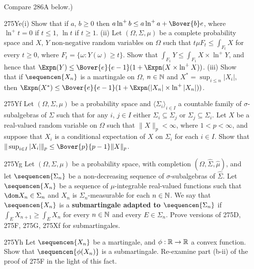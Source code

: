 {



\noindent Compare 286A below.)

\spheader 275Ye(i)
Show that if $a$, $b\ge 0$ then
$a\ln^+b\le a\ln^+a+\Bover{b}e$, where $\ln^+t=0$ if $t\le 1$,
$\ln t$ if $t\ge 1$.
(ii) Let $(\Omega,\Sigma,\mu)$ be a
complete probability space and $X$, $Y$
non-negative random variables on $\Omega$ such that
$t\mu F_t\le\int_{F_t}X$ for every $t\ge 0$, where
$F_t=\{\omega:Y(\omega)\ge t\}$.   Show that
$\int_{F_1}Y\le\int_{F_1}X\times\ln^+Y$, and hence that
$\Expn(Y)\le\Bover{e}{e-1}(1+\Expn(X\times\ln^+X))$.   (iii) Show that
if $\sequencen{X_n}$ is a martingale on $\Omega$, $n\in\Bbb N$ and
$X^*=\sup_{i\le n}|X_i|$, then
$\Expn(X^*)\le\Bover{e}{e-1}(1+\Expn(|X_n|\times\ln^+|X_n|))$.

\spheader 275Yf Let $(\Omega,\Sigma,\mu)$ be a probability space
and $\langle\Sigma_i\rangle_{i\in I}$ a countable family  of
$\sigma$-subalgebras of $\Sigma$ such that for any $i$, $j\in I$ either
$\Sigma_i\subseteq\Sigma_j$ or $\Sigma_j\subseteq\Sigma_i$.   Let $X$ be
a real-valued random variable on $\Omega$ such that $\|X\|_p<\infty$,
where $1<p<\infty$, and suppose that $X_i$ is a conditional expectation
of $X$ on $\Sigma_i$ for each $i\in I$.   Show that
$\|\sup_{i\in I}|X_i|\|_p\le\Bover{p}{p-1}\|X\|_p$.

\spheader 275Yg Let $(\Omega,\Sigma,\mu)$ be a probability
space, with completion $(\Omega,\hat\Sigma,\hat\mu)$, and let
$\sequencen{\Sigma_n}$ be a non-decreasing sequence of
$\sigma$-subalgebras of $\hat\Sigma$.   Let $\sequencen{X_n}$ be a
sequence of $\mu$-integrable real-valued functions such that
$\dom X_n\in\Sigma_n$ and $X_n$ is
$\Sigma_n$-measurable for each $n\in\Bbb N$.   We say that
$\sequencen{X_n}$ is a {\bf submartingale adapted to
$\sequencen{\Sigma_n}$} if
$\int_EX_{n+1}\ge\int_EX_n$ for every
$n\in\Bbb N$ and every $E\in\Sigma_n$.
Prove versions of 275D, 275F, 275G, 275Xf for submartingales.

\spheader 275Yh Let $\sequencen{X_n}$ be a martingale, and
$\phi:\Bbb R\to\Bbb R$ a convex function.   Show that
$\sequencen{\phi(X_n)}$ is a submartingale.   
Re-examine part (b-ii) of the proof of 275F in the light of
this fact.

}
